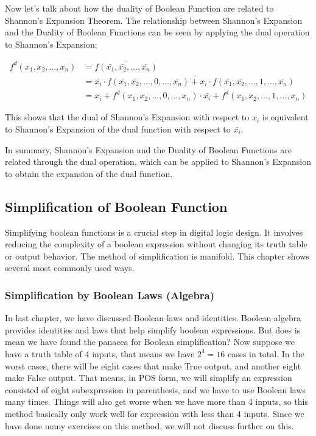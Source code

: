     Now let's talk about how the duality of Boolean Function are related to Shannon's Expansion Theorem.
    The relationship between Shannon's Expansion and the Duality of Boolean Functions can be seen by applying the dual operation to Shannon's Expansion:

    \begin{align*}
    f^d(x_1, x_2, \ldots, x_n) &= \overline{f(\bar{x_1}, \bar{x_2}, \ldots, \bar{x_n})} \\
    &= \overline{\bar{x_i} \cdot f(\bar{x_1}, \bar{x_2}, \ldots,0, \ldots, \bar{x_n}) + x_i \cdot f(\bar{x_1}, \bar{x_2}, \ldots, 1,\ldots, \bar{x_n})} \\
    &= x_i + f^d(x_1, x_2, \ldots,0, \ldots, x_n) \cdot \bar{x_i} + f^d(x_1, x_2, \ldots, 1,\ldots, x_n)
    \end{align*}

    This shows that the dual of Shannon's Expansion with respect to $x_i$ is equivalent to Shannon's Expansion of the dual function with respect to $\bar{x_i}$.

    In summary, Shannon's Expansion and the Duality of Boolean Functions are related through the dual operation, which can be applied to Shannon's Expansion to obtain the expansion of the dual function.
    \subsection{Simplification of Boolean Function}
    Simplifying boolean functions is a crucial step in digital logic design. It involves reducing the complexity of a boolean expression without changing its truth table or output behavior. The method of simplification is
    manifold. This chapter shows several most commonly used ways.
    
    \subsubsection{Simplification by Boolean Laws (Algebra)}
	In last chapter, we have discussed Boolean laws and identities. Boolean algebra provides identities and laws that help simplify boolean expressions. But does is mean we have found the panacea for Boolean simplification?
	Now suppose we have a truth table of 4 inputs, that means we have $2^4 = 16$ cases in total. In the worst cases, there will be eight cases that make True output, and another eight make False output. That means, in POS form, we will simplify an expression consisted of eight subexpression in parenthesis, and we have to
	use Boolean laws many times. Things will also get worse when we have more than 4 inputs, so this method basically only work well for expression with less than 4 inputs. Since we have done many exercises on this
	method, we will not discuss further on this.
	
